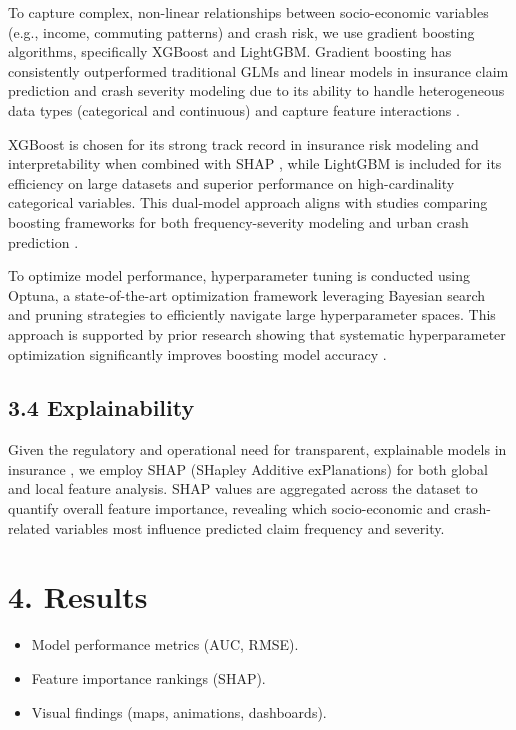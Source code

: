 \documentclass[
  number,
  review,
  3p]{elsarticle}
\providecommand{\tightlist}{%
  \setlength{\itemsep}{0pt}\setlength{\parskip}{0pt}}
\begin{document}
To capture complex, non-linear relationships between socio-economic
variables (e.g., income, commuting patterns) and crash risk, we use
gradient boosting algorithms, specifically XGBoost and LightGBM.
Gradient boosting has consistently outperformed traditional GLMs and
linear models in insurance claim prediction and crash severity modeling
due to its ability to handle heterogeneous data types (categorical and
continuous) and capture feature interactions \citep{clemente, mohamed}.

XGBoost is chosen for its strong track record in insurance risk modeling
and interpretability when combined with SHAP \citep{dong}, while
LightGBM is included for its efficiency on large datasets and superior
performance on high-cardinality categorical variables. This dual-model
approach aligns with studies comparing boosting frameworks for both
frequency-severity modeling \citep{henckaerts} and urban crash
prediction \citep{adeniyi}.

To optimize model performance, hyperparameter tuning is conducted using
Optuna, a state-of-the-art optimization framework leveraging Bayesian
search and pruning strategies to efficiently navigate large
hyperparameter spaces. This approach is supported by prior research
showing that systematic hyperparameter optimization significantly
improves boosting model accuracy \citep{liu}.

\subsection{3.4 Explainability}\label{explainability}

Given the regulatory and operational need for transparent, explainable
models in insurance \citep{henckaerts, lundberg}, we employ SHAP
(SHapley Additive exPlanations) for both global and local feature
analysis. SHAP values are aggregated across the dataset to quantify
overall feature importance, revealing which socio-economic and
crash-related variables most influence predicted claim frequency and
severity.

\section{4. Results}\label{results}

\begin{itemize}
\tightlist
\item
  Model performance metrics (AUC, RMSE).
\item
  Feature importance rankings (SHAP).
\item
  Visual findings (maps, animations, dashboards).
\end{itemize}
\end{document}
